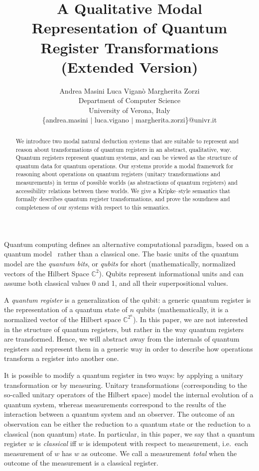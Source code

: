 \documentclass[times, 10pt]{article}
\title{A Qualitative Modal Representation of Quantum Register Transformations \\
(Extended Version)}
\author{Andrea Masini \qquad Luca Vigan\`o \qquad Margherita Zorzi  \\
Department of Computer Science \\
University of Verona, Italy \\
\{andrea.masini $\mid$ luca.vigano $\mid$ margherita.zorzi\}@univr.it}
\begin{document}
\maketitle
\thispagestyle{empty}

\begin{abstract}
  We introduce two modal natural deduction systems that are suitable to
  represent and reason about transformations of quantum registers in an abstract, qualitative, way.
  Quantum registers represent quantum systems, and can be viewed as the 
  structure of quantum data for quantum operations. 
  Our systems provide a modal framework for reasoning about operations on quantum registers (unitary transformations and measurements)
  in terms of possible worlds (as abstractions of quantum registers) and accessibility relations between these worlds. We give a Kripke--style
  semantics that formally describes quantum register transformations, and prove the 
  soundness and completeness of our systems with respect to this semantics.
\end{abstract}


Quantum computing 
defines an alternative computational paradigm, based on a quantum 
model~\cite{BasDa05short} rather than a classical one. The basic units of the quantum model are the 
\textit{quantum bits}, or \textit{qubits} for short (mathematically, normalized vectors of the Hilbert Space 
$\mathds{C}^{2}$).  Qubits represent informational units and can assume both classical values 0 and 1, and all their superpositional values.

A \emph{quantum register} is a generalization of the qubit: a generic quantum register is the representation of a quantum state of $n$ qubits (mathematically, it is a normalized vector of the
Hilbert space $\mathds{C}^{2^n}$). In this paper, we are not interested in the structure of  quantum registers, but rather in the way quantum registers are transformed. Hence, we will abstract away from the internals of quantum registers and represent them in a generic way in order to 
describe how operations transform a register into another one.

It is possible to modify a quantum register in two ways: by applying a unitary transformation 
or by measuring.  Unitary transformations (corresponding to the so-called unitary operators of 
the Hilbert space) model the internal evolution of a quantum system, whereas measurements 
correspond to the results of the interaction between a quantum system and an observer.  
The outcome of an observation can be either the reduction to a quantum
state or the reduction to a classical (non quantum) state. 
In particular, in this paper, we say that a quantum register $w$ is \emph{classical} iff $w$ is idempotent with respect to measurement, i.e.~each measurement of $w$ has $w$ as outcome. 
We call a measurement \emph{total} when the outcome of the measurement 
is a classical register.
\end{document}
